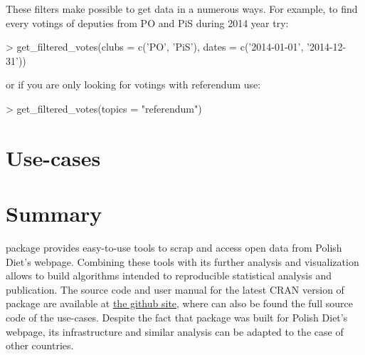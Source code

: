 These filters make possible to get data in a numerous ways. For example, to find every votings of deputies from PO and PiS during 2014 year try:

\begin{example}
> get_filtered_votes(clubs = c('PO', 'PiS'), dates = c('2014-01-01', '2014-12-31'))
\end{example}

or if you are only looking for votings with referendum use:

\begin{example}
> get_filtered_votes(topics = "referendum")
\end{example}

\section{Use-cases}


\section{Summary}

 package provides easy-to-use tools to scrap and access open data from Polish Diet's webpage. Combining these tools with its further analysis and visualization
allows to build algorithms intended to reproducible statistical analysis and publication. The source code and user manual for the latest CRAN version of  package are available at \href{https://github.com/mi2-warsaw/sejmRP}{the github site}, where can also be found the full source code of the use-cases. Despite the fact that  package was built for Polish Diet's webpage, its infrastructure and similar analysis can be adapted to the case of other countries.



\address{Piotr Smuda\\
  Faculty of Mathematics and Information Science\\
  Warsaw University of Technology\\
  Koszykowa 75, 00-662 Warsaw\\
  Poland\\}

\address{Przemysław Biecek\\
  Faculty of Mathematics and Information Science\\
  Warsaw University of Technology\\
  Koszykowa 75, 00-662 Warsaw\\
  Poland\\}
